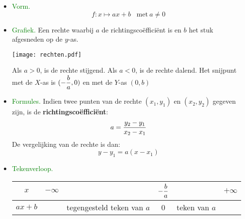 \begin{itemize}
  \item \textcolor{green}{Vorm.}
    \[
      f: x\mapsto ax+b \;\;\;\mbox{met}\: a\neq 0
    \]
  \item \textcolor{green}{Grafiek.}\newline
    Een rechte waarbij $a$ de richtingsco\"effici\"ent is en $b$ het stuk afgesneden op de $y$-as.
    \begin{center}
    \texttt{[image: rechten.pdf]}
    \end{center}
    Als $a>0$, is de rechte stijgend.\newline
    Als $a<0$, is de rechte dalend.\newline
    Het snijpunt met de $X$-as is $(-\displaystyle\frac{\displaystyle b}{\displaystyle a}, 0)$ en met de $Y$-as $(0, b)$
  \item \textcolor{green}{Formules.}\newline
    Indien twee punten van de rechte $(x_1, y_1)$ en $(x_2, y_2)$ gegeven zijn, is de {\bf richtingsco\"effici\"ent}:
    \[a=\displaystyle\frac{\displaystyle y_2-y_1}{\displaystyle x_2-x_1}\]
    De \hypertarget{vgl_rechte}{vergelijking van de rechte} is dan:
    \[
      y-y_1=a(x-x_1)
    \]\label{vgl_rechte}
  \item \textcolor{green}{Tekenverloop.}\newline
    \begin{tabular}{c|ccccc}
    $x$ & $-\infty$ & & $-\displaystyle\frac{\displaystyle b}{\displaystyle a}$ & & $+\infty$\\
    \hline
    $ax+b$ & & tegengesteld teken van $a$ & 0 & teken van $a$ & \\		
    \end{tabular}
\end{itemize}

\hypertarget{tweedegraadsfuncties}{}
